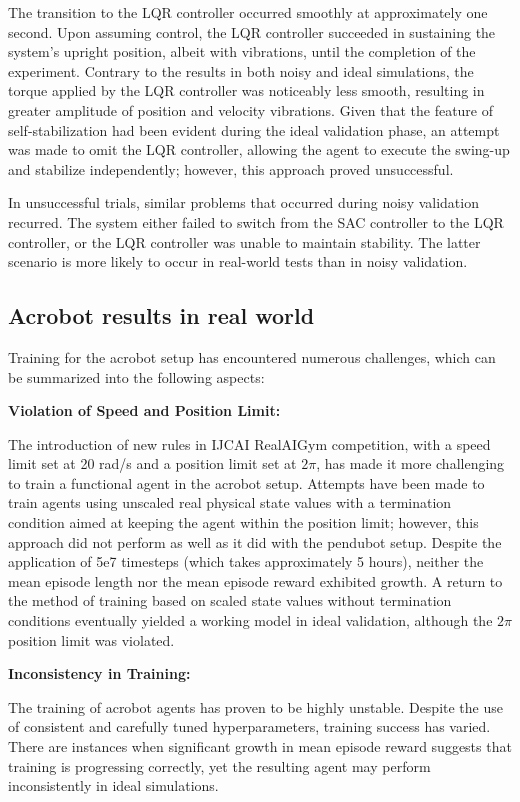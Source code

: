 The transition to the LQR controller occurred smoothly at approximately one second. Upon assuming control, the LQR controller succeeded in sustaining the system's upright position, albeit with vibrations, until the completion of the experiment. Contrary to the results in both noisy and ideal simulations, the torque applied by the LQR controller was noticeably less smooth, resulting in greater amplitude of position and velocity vibrations. Given that the feature of self-stabilization had been evident during the ideal validation phase, an attempt was made to omit the LQR controller, allowing the agent to execute the swing-up and stabilize independently; however, this approach proved unsuccessful.

In unsuccessful trials, similar problems that occurred during noisy validation recurred. The system either failed to switch from the SAC controller to the LQR controller, or the LQR controller was unable to maintain stability. The latter scenario is more likely to occur in real-world tests than in noisy validation.


\subsection{Acrobot results in real world}
Training for the acrobot setup has encountered numerous challenges, which can be summarized into the following aspects:

\textbf{Violation of Speed and Position Limit:}

The introduction of new rules in IJCAI RealAIGym competition\cite{dfki_ric_underactuated_lab_2023}, with a speed limit set at 20 rad/s and a position limit set at \(2\pi\), has made it more challenging to train a functional agent in the acrobot setup. Attempts have been made to train agents using unscaled real physical state values with a termination condition aimed at keeping the agent within the position limit; however, this approach did not perform as well as it did with the pendubot setup. Despite the application of 5e7 timesteps (which takes approximately 5 hours), neither the mean episode length nor the mean episode reward exhibited growth. A return to the method of training based on scaled state values without termination conditions eventually yielded a working model in ideal validation, although the \(2\pi\) position limit was violated.

\textbf{Inconsistency in Training:}

The training of acrobot agents has proven to be highly unstable. Despite the use of consistent and carefully tuned hyperparameters, training success has varied. There are instances when significant growth in mean episode reward suggests that training is progressing correctly, yet the resulting agent may perform inconsistently in ideal simulations.


